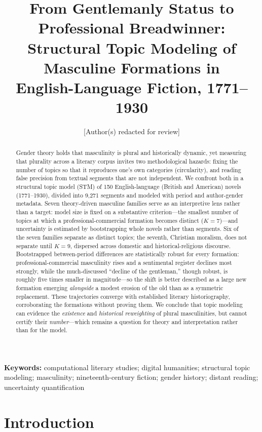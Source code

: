 \documentclass[11pt]{article}
\title{\textbf{From Gentlemanly Status to Professional Breadwinner:\\
Structural Topic Modeling of Masculine Formations in\\
English-Language Fiction, 1771--1930}}
\author{[Author(s) redacted for review]}
\date{}
\begin{document}
\maketitle

\begin{abstract}
\noindent Gender theory holds that masculinity is plural and historically
dynamic, yet measuring that plurality across a literary corpus invites two
methodological hazards: fixing the number of topics so that it reproduces one's
own categories (circularity), and reading false precision from textual segments
that are not independent. We confront both in a structural topic model (STM) of
150 English-language (British and American) novels (1771--1930), divided into
9{,}271 segments and modeled with period and author-gender metadata. Seven
theory-driven masculine families serve as an interpretive lens rather than a
target: model size is fixed on a substantive criterion---the smallest number of
topics at which a professional-commercial formation becomes distinct
($K=7$)---and uncertainty is estimated by bootstrapping whole novels rather than
segments. Six of the seven families separate as distinct topics; the seventh,
Christian moralism, does not separate until $K=9$, dispersed across domestic and
historical-religious discourse. Bootstrapped between-period differences are
statistically robust for every formation: professional-commercial masculinity
rises and a sentimental register declines most strongly, while the
much-discussed ``decline of the gentleman,'' though robust, is roughly five
times smaller in magnitude---so the shift is better described as a large new
formation emerging \emph{alongside} a modest erosion of the old than as a
symmetric replacement. These trajectories converge with established literary
historiography, corroborating the formations without proving them. We conclude
that topic modeling can
evidence the \emph{existence} and \emph{historical reweighting} of plural
masculinities, but cannot certify their \emph{number}---which remains a question
for theory and interpretation rather than for the model.
\end{abstract}

\noindent\textbf{Keywords:} computational literary studies; digital humanities;
structural topic modeling; masculinity; nineteenth-century fiction; gender
history; distant reading; uncertainty quantification

\section{Introduction}
\end{document}
